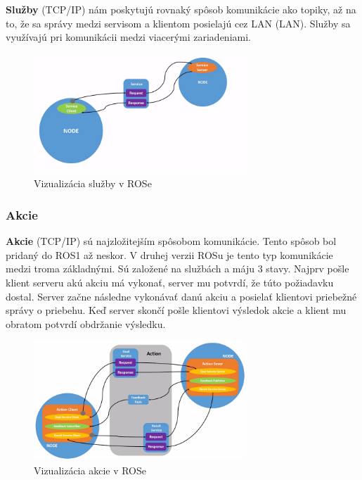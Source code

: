 \textbf {Služby} (TCP/IP) nám poskytujú rovnaký spôsob komunikácie ako topiky, až na to, že sa správy medzi servisom a klientom posielajú
cez LAN (\acrlong{LAN}). Služby sa využívajú pri komunikácii medzi viacerými zariadeniami.

\begin{figure}[h]
	\centering
	\includegraphics[width=8cm]{img/serviceExplanation.png}
	\caption{Vizualizácia služby v ROSe \cite{RosDoc}}
	\label{o_service}
\end{figure}

\subsubsection{Akcie}

\label{s_action}
\textbf {Akcie} (TCP/IP) sú najzložitejším spôsobom komunikácie. Tento spôsob bol pridaný do ROS1 až neskor. V druhej verzii ROSu je tento
typ komunikácie medzi troma základnými. Sú založené na službách a máju 3 stavy. Najprv pošle klient serveru akú akciu má vykonať, server mu potvrdí,
že túto požiadavku dostal. Server začne následne vykonávať danú akciu a posielať klientovi priebežné správy o priebehu. Keď server skončí pošle
klientovi výsledok akcie a klient mu obratom potvrdí obdržanie výsledku.

\begin{figure}[h]
	\centering
	\includegraphics[width=8cm]{img/actionExplanation.png}
	\caption{Vizualizácia akcie v ROSe \cite{RosDoc}}
	\label{o_action}
\end{figure}

